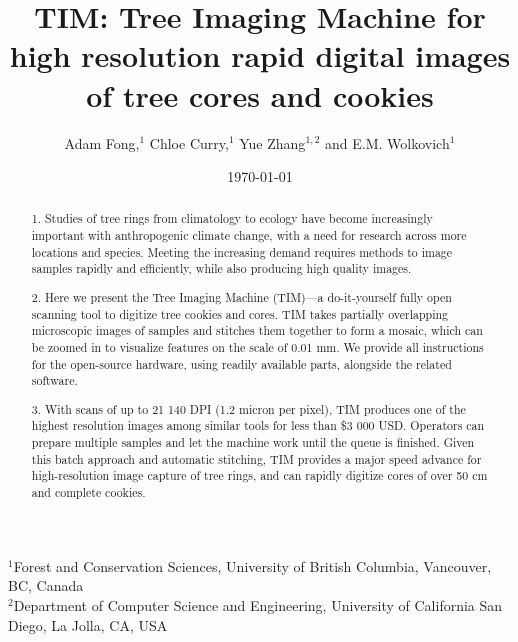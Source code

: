 \documentclass[a4paper,12pt]{article}
\title{TIM: Tree Imaging Machine for high resolution rapid digital images of tree cores and cookies}
\author{Adam Fong,$^{1}$ Chloe Curry,$^{1}$ Yue Zhang$^{1, 2}$ and E.M. Wolkovich$^{1}$} %
\date{\today}
\begin{document}
\maketitle

\noindent $^{1}$Forest and Conservation Sciences, University of British Columbia, Vancouver, BC, Canada\\
$^{2}$Department of Computer Science and Engineering, University of California San Diego, La Jolla, CA, USA\\ 

\begin{abstract}  

1.  Studies of tree rings from climatology to ecology have become increasingly important with anthropogenic climate change, with a need for research across more locations and species. Meeting the increasing demand requires methods to image samples rapidly and efficiently, while also producing high quality images. %

2.  Here we present the Tree Imaging Machine (TIM)---a do-it-yourself fully open scanning tool to digitize tree cookies and cores. TIM takes partially overlapping microscopic images of samples and stitches them together to form a mosaic, which can be zoomed in to visualize features on the scale of 0.01 mm. 
We provide all instructions for the open-source hardware, using readily available parts, alongside the related software. %

3. With scans of up to 21 140 DPI (1.2 micron per pixel), TIM produces one of the highest resolution images among similar tools for less than \$3 000 USD. Operators can prepare multiple samples and let the machine work until the queue is finished. Given this batch approach and automatic stitching, TIM provides a major speed advance for high-resolution image capture of tree rings, and can rapidly digitize cores of over 50 cm and complete cookies. %


\end{abstract}
\end{document}
